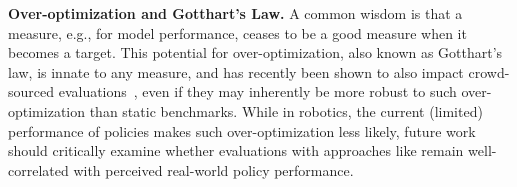 \textbf{Over-optimization and Gotthart's Law.} A common wisdom is that a measure, e.g., for model performance, ceases to be a good measure when it becomes a target. This potential for over-optimization, also known as Gotthart's law, is innate to any measure, and has recently been shown to also impact crowd-sourced evaluations~\citep{theregister2025llamacheating}, even if they may inherently be more robust to such over-optimization than static benchmarks. While in robotics, the current (limited) performance of policies makes such over-optimization less likely, future work should critically examine whether evaluations with approaches like \Acronym{} remain well-correlated with perceived real-world policy performance.

